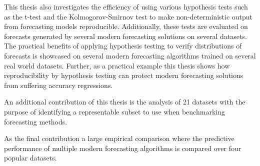 This thesis also investigates the efficiency of using various hypothesis tests such as the t-test and the Kolmogorov-Smirnov test to make non-deterministic output from forecasting models reproducible. Additionally, these tests are evaluated on forecasts generated by several modern forecasting solutions on several datasets. The practical benefits of applying hypothesis testing to verify distributions of forecasts is showcased on several modern forecasting algorithms trained on several real world datasets. Further, as a practical example this thesis shows how reproducibility by hypothesis testing can protect modern forecasting solutions from suffering accuracy regressions.

An additional contribution of this thesis is the analysis of 21 datasets with the purpose of identifying a representable subset to use when benchmarking forecasting methods.

As the final contribution a large empirical comparison where the predictive performance of multiple modern forecasting algorithms is compared over four popular datasets.






